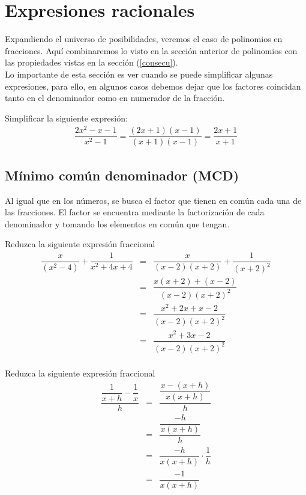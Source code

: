 \section{Expresiones racionales}
Expandiendo el universo de posibilidades, veremos el caso de polinomios en fracciones. Aquí combinaremos lo visto en la sección anterior de polinomios con las propiedades vistas en la sección (\ref{consecu}).\\
Lo importante de esta sección es ver cuando se puede simplificar algunas expresiones, para ello, en algunos casos debemos dejar que los factores coincidan tanto en el denominador como en numerador de la fracción.\\
\begin{myexample}
Simplificar la siguiente expresión:
\begin{eqnarray*}
\dfrac{2x^{2}-x-1}{x^{2}-1}=\dfrac{(2x+1)(x-1)}{(x+1)(x-1)}=\dfrac{2x+1}{x+1}
\end{eqnarray*}
\end{myexample}

\subsection{Mínimo común denominador (MCD)}
Al igual que en los números, se busca el factor que tienen en común cada una de las fracciones. El factor se encuentra mediante la factorización de cada denominador y tomando los elementos en común que tengan. 

\begin{myexample}
Reduzca la siguiente expresión fraccional
\begin{eqnarray*}
\dfrac{x}{(x^{2}-4)}+\dfrac{1}{x^{2}+4x+4}&=& \dfrac{x}{(x-2)(x+2)}+\dfrac{1}{(x+2)^{2}}\\
&=&\dfrac{x(x+2)+(x-2)}{(x-2)(x+2)^{2}}\\
&=&\dfrac{x^{2}+2x+x-2}{(x-2)(x+2)^{2}}\\
&=&\dfrac{x^{2}+3x-2}{(x-2)(x+2)^{2}}\\
\end{eqnarray*}
\end{myexample}

\begin{myexample}
Reduzca la siguiente expresión fraccional
\begin{eqnarray*}
\dfrac{\dfrac{1}{x+h}-\dfrac{1}{x}}{h}&=&\dfrac{\dfrac{x-(x+h)}{x(x+h)}}{h}\\
&=&\dfrac{\dfrac{-h}{x(x+h)}}{h}\\
&=&\dfrac{-h}{x(x+h)}\cdot \dfrac{1}{h}\\
&=&\dfrac{-1}{x(x+h)}
\end{eqnarray*}
\end{myexample}